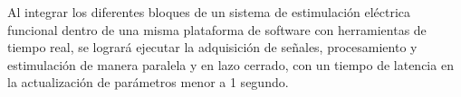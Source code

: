 
Al integrar los diferentes bloques de un sistema de estimulación eléctrica funcional dentro de una misma plataforma de software con herramientas de tiempo real, se logrará ejecutar la adquisición de señales, procesamiento y estimulación de manera paralela y en lazo cerrado, con un tiempo de latencia en la actualización de parámetros menor a 1 segundo.